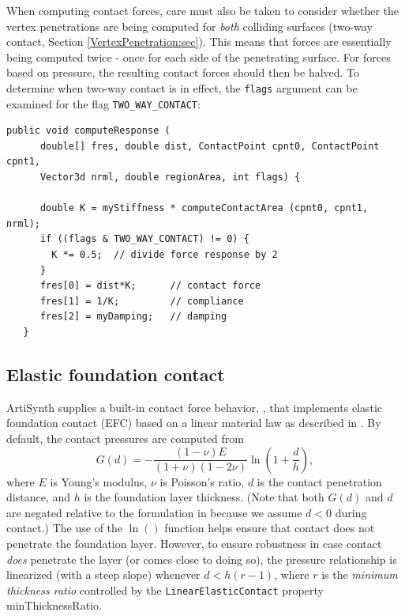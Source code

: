 When computing contact forces, care must also be taken to consider
whether the vertex penetrations are being computed for {\it both}
colliding surfaces (two-way contact,
Section \ref{VertexPenetration:sec}).  This means that forces are
essentially being computed twice - once for each side of the
penetrating surface. For forces based on pressure, the resulting
contact forces should then be halved. To determine when two-way
contact is in effect, the {\tt flags} argument can be examined for the
flag {\tt TWO\_WAY\_CONTACT}:
\begin{lstlisting}[]
   public void computeResponse (
      double[] fres, double dist, ContactPoint cpnt0, ContactPoint cpnt1, 
      Vector3d nrml, double regionArea, int flags) {

      double K = myStiffness * computeContactArea (cpnt0, cpnt1, nrml);
      if ((flags & TWO_WAY_CONTACT) != 0) {
        K *= 0.5;  // divide force response by 2
      }
      fres[0] = dist*K;      // contact force
      fres[1] = 1/K;         // compliance
      fres[2] = myDamping;   // damping
   }
\end{lstlisting}

\subsection{Elastic foundation contact}
\label{ElasticFoundationContact:sec}

ArtiSynth supplies a built-in contact force behavior,
,
that implements elastic foundation contact (EFC) based on a linear material
law as described in \cite{bei2004multibody}.  
By default, the contact pressures are computed from
%
\begin{equation}
G(d) = -\frac{(1-\nu) E}{(1+\nu)(1-2 \nu)} \ln \left( 1 + \frac{d}{h} \right),
\label{logEFC:eqn}
\end{equation}
%
where $E$ is Young's modulus, $\nu$ is Poisson's ratio, $d$ is the
contact penetration distance, and $h$ is the foundation layer
thickness. (Note that both $G(d)$ and $d$ are negated relative to the
formulation in \cite{bei2004multibody} because we assume $d <0$ during
contact.) The use of the $\ln()$ function helps ensure that contact
does not penetrate the foundation layer. However, to ensure robustness
in case contact {\it does} penetrate the layer (or comes close to
doing so), the pressure relationship is linearized (with a steep
slope) whenever $d < h (r-1)$, where $r$ is the {\it minimum thickness
ratio} controlled by the {\tt LinearElasticContact} property {\sf
minThicknessRatio}.

